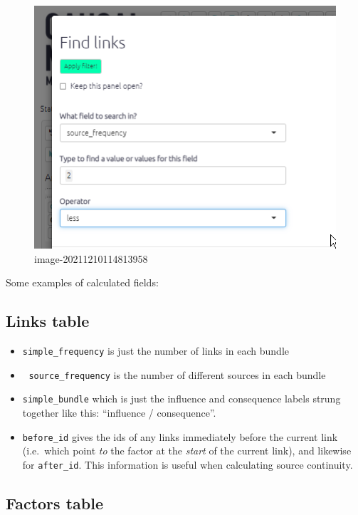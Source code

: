 \documentclass[
]{book}
\providecommand{\tightlist}{%
  \setlength{\itemsep}{0pt}\setlength{\parskip}{0pt}}
\begin{document}
\begin{figure}
\centering
\includegraphics[width=6.77083in,height=\textheight]{_assets/image-20211210114813958.png}
\caption{image-20211210114813958}
\end{figure}

Some examples of calculated fields:

\hypertarget{links-table}{%
\subsection{Links table}\label{links-table}}

\begin{itemize}
\tightlist
\item
  \texttt{simple\_frequency} is just the number of links in each bundle
\item
  🧪 \texttt{source\_frequency} is the number of different sources in each bundle
\item
  \texttt{simple\_bundle} which is just the influence and consequence labels strung together like this: ``influence / consequence''.
\item
  \texttt{before\_id} gives the ids of any links immediately before the current link (i.e.~which point \emph{to} the factor at the \emph{start} of the current link), and likewise for \texttt{after\_id}. This information is useful when calculating source continuity.
\end{itemize}

\hypertarget{factors-table}{%
\subsection{Factors table}\label{factors-table}}
\end{document}
